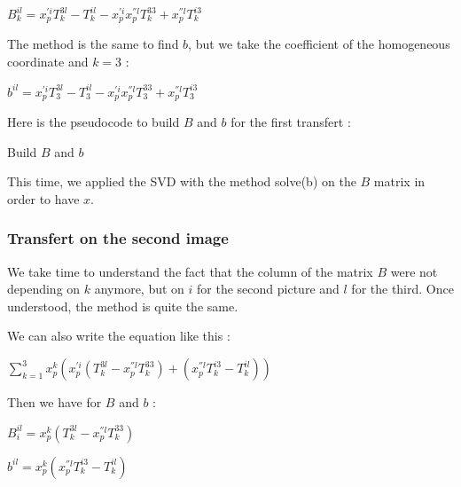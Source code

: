 \documentclass{report}
\begin{document}
\begin{center}
$B_{k}^{il} = x_{p}^{'i}T_{k}^{3l} - T_{k}^{il} - x_{p}^{'i}x_{p}^{''l}T_{k}^{33} + x_{p}^{''l}T_{k}^{i3}$
\end{center}

The method is the same to find $b$, but we take the coefficient of the homogeneous coordinate and $k=3$ : 

\begin{center}
$b^{il} = x_{p}^{'i}T_{3}^{3l} - T_{3}^{il} - x_{p}^{'i}x_{p}^{''l}T_{3}^{33} + x_{p}^{''l}T_{3}^{i3}$
\end{center}


Here is the pseudocode to build $B$ and $b$ for the first transfert : 
\begin{algorithm}
\SetLine
\caption{Build $B$ and $b$}
\SetLine
{}
\end{algorithm}

This time, we applied the SVD with the method solve(b) on the $B$ matrix in order to have $x$. 
\newpage
\subsubsection{Transfert on the second image}
We take time to understand the fact that the column of the matrix $B$ were not depending on $k$ anymore, but on $i$ for the second picture and $l$ for the third. Once understood, the method is quite the same. 

We can also write the equation like this : 

\begin{center}
 $ \displaystyle { \sum_{k = 1}^{3}} x_{p}^{k}(x_{p}^{'i} (T_{k}^{3l} - x_{p}^{''l}T_{k}^{33}) + ( x_{p}^{''l}T_{k}^{i3} - T_{k}^{il} ))$
\end{center}

Then we have for $B$ and $b$ :  
\begin{center}
$B_{i}^{il} = x_{p}^{k}(T_{k}^{3l} - x_{p}^{''l}T_{k}^{33})$
\end{center}
\begin{center}
$b^{il} = x_{p}^{k}(x_{p}^{''l}T_{k}^{i3} - T_{k}^{il})$
\end{center}
\end{document}
